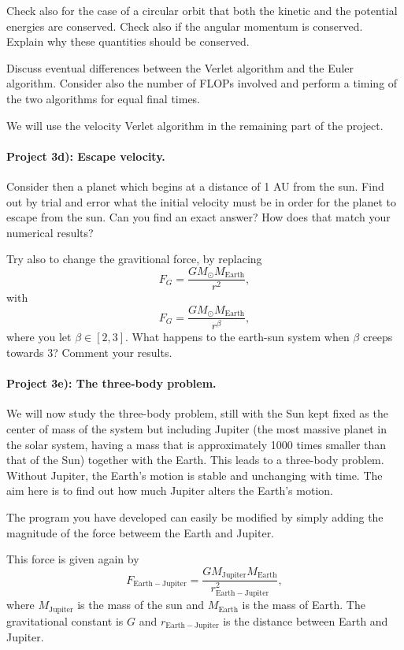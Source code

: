 \documentclass[%
oneside,                 %
final,                   %
10pt]{article}
\begin{document}
Check also for the case of a circular orbit that both the kinetic and the potential energies are conserved.
Check also if the  angular momentum is conserved. Explain why these quantities
should be conserved.

Discuss eventual differences between the Verlet algorithm and the Euler algorithm. Consider also the number of FLOPs involved and perform a timing of the
two algorithms for equal final times.

We will use the velocity Verlet algorithm in the remaining part of the project. 



\paragraph{Project 3d): Escape velocity.}
Consider then a planet which begins at a distance of 1 AU from the sun. Find out by trial and error
what the initial velocity must be in order for the planet to escape from the sun.  Can you find an exact answer?  How does that match your numerical results?

Try also to change the gravitional force, by replacing 
\[
F_G=\frac{GM_{\odot}M_{\mathrm{Earth}}}{r^2},
\]
with
\[
F_G=\frac{GM_{\odot}M_{\mathrm{Earth}}}{r^{\beta}},
\]
where you let $\beta\in [2,3]$. What happens to the earth-sun system when $\beta$ creeps towards $3$? Comment your results.
\paragraph{Project 3e): The three-body problem.}
We will now study the three-body problem, still with the Sun kept fixed as the center of mass of the system  but 
including Jupiter (the most massive planet in the solar system, having a mass that is approximately 1000 times
smaller than that of the Sun) together with the Earth. This leads to a three-body problem. Without Jupiter, the Earth's motion is stable and unchanging with time. The aim here is to find out how much Jupiter alters the Earth's motion.

The program you have developed can easily be modified by simply adding the magnitude of the force betweem the Earth and Jupiter.

This force is given again by 
\[
F_{\mathrm{Earth-Jupiter}}=\frac{GM_{\mathrm{Jupiter}}M_{\mathrm{Earth}}}{r_{\mathrm{Earth-Jupiter}}^2},
\]
where $M_{\mathrm{Jupiter}}$ is the mass of the sun and $M_{\mathrm{Earth}}$ is the mass of Earth. 
The gravitational constant is $G$ and $r_{\mathrm{Earth-Jupiter}}$ is the distance between Earth and Jupiter.
\end{document}
